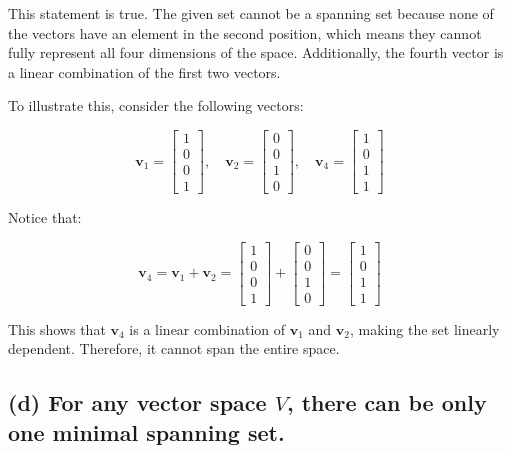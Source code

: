 \documentclass{article}
\begin{document}
This statement is true. The given set cannot be a spanning set because none of the vectors have an element in the second position, which means they cannot fully represent all four dimensions of the space. Additionally, the fourth vector is a linear combination of the first two vectors.

To illustrate this, consider the following vectors:

\[
\mathbf{v}_1 = \begin{bmatrix} 1 \\ 0 \\ 0 \\ 1 \end{bmatrix}, \quad 
\mathbf{v}_2 = \begin{bmatrix} 0 \\ 0 \\ 1 \\ 0 \end{bmatrix}, \quad 
\mathbf{v}_4 = \begin{bmatrix} 1 \\ 0 \\ 1 \\ 1 \end{bmatrix}
\]

Notice that:

\[
\mathbf{v}_4 = \mathbf{v}_1 + \mathbf{v}_2 = \begin{bmatrix} 1 \\ 0 \\ 0 \\ 1 \end{bmatrix} + \begin{bmatrix} 0 \\ 0 \\ 1 \\ 0 \end{bmatrix} = \begin{bmatrix} 1 \\ 0 \\ 1 \\ 1 \end{bmatrix}
\]

This shows that $\mathbf{v}_4$ is a linear combination of $\mathbf{v}_1$ and $\mathbf{v}_2$, making the set linearly dependent. Therefore, it cannot span the entire space.

\subsection*{(d) For any vector space $V$, there can be only one minimal spanning set.}
\end{document}
